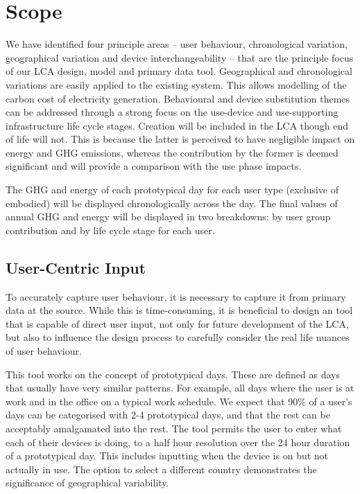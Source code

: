\documentclass[conference]{IEEEtran}
\begin{document}
\section{Scope}

We have identified four principle areas -- user behaviour,
chronological variation, geographical variation and device
interchangeability -- that are the principle focus of our LCA design,
model and primary data tool. Geographical and chronological variations
are easily applied to the existing system. This allows modelling of
the carbon cost of electricity generation. Behavioural and device
substitution themes can be addressed through a strong focus on the
use-device and use-supporting infrastructure life cycle
stages. Creation will be included in the LCA though end of life will
not. This is because the latter is perceived to have negligible impact
on energy and GHG emissions, whereas the contribution by the former is
deemed significant and will provide a comparison with the use phase
impacts.

The GHG and energy of each prototypical day for each user type
(exclusive of embodied) will be displayed chronologically across the
day. The final values of annual GHG and energy will be displayed in two
breakdowns: by user group contribution and by life cycle stage for
each user.

\subsection{User-Centric Input}

To accurately capture user behaviour, it is necessary to capture it
from primary data at the source. While this is time-consuming, it is
beneficial to design an tool that is capable of direct user input, not
only for future development of the LCA, but also to influence the
design process to carefully consider the real life nuances of user
behaviour.

This tool works on the concept of prototypical days. These are defined
as days that usually have very similar patterns. For example, all days
where the user is at work and in the office on a typical work
schedule. We expect that 90\% of a user’s days can be categorised with
2-4 prototypical days, and that the rest can be acceptably amalgamated
into the rest. The tool permits the user to enter what each of their
devices is doing, to a half hour resolution over the 24 hour duration
of a prototypical day. This includes inputting when the device is on
but not actually in use.  The option to select a different country
demonstrates the significance of geographical variability.
\end{document}
